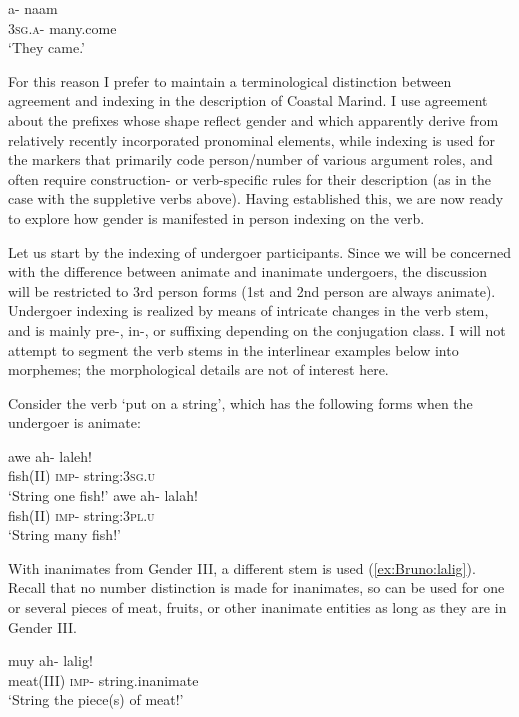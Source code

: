 \documentclass[output=collectionpaper]{langsci/langscibook}
\begin{document}
\ea
\label{ex:Bruno:naxam}
\gll a- na\GH am\\
3\textsc{sg}.\textsc{a}- many.come\\
\glt `They came.'
\z

For this reason I prefer to maintain a terminological distinction between agreement and indexing in the description of Coastal Marind. I use agreement about the prefixes whose shape reflect gender and which apparently derive from relatively recently incorporated pronominal elements, while indexing is used for the markers that primarily code person/number of various argument roles, and often require construction- or verb-specific rules for their description (as in the case with the suppletive verbs above). Having established this, we are now ready to explore how gender is manifested in person indexing on the verb.

Let us start by the indexing of undergoer participants. Since we will be concerned with the difference between animate and inanimate undergoers, the discussion will be restricted to 3rd person forms (1st and 2nd person are always animate). Undergoer indexing is realized by means of intricate changes in the verb stem, and is mainly pre-, in-, or suffixing depending on the conjugation class. I will not attempt to segment the verb stems in the interlinear examples below into morphemes; the morphological details are not of interest here.

Consider the verb `put on a string', which has the following forms when the undergoer is animate:

\ea\label{ex:Bruno:}
\begin{xlist}
\ex
\gll awe ah- laleh!\\
fish(II) \textsc{imp}- string:3\textsc{sg}.\textsc{u}\\
\glt `String one fish!'
\ex
\gll awe ah- lalah!\\
fish(II) \textsc{imp}- string:3\textsc{pl}.\textsc{u}\\
\glt `String many fish!'
\end{xlist}
\z

\noindent With inanimates from Gender III, a different stem  is used (\ref{ex:Bruno:lalig}). Recall that no number distinction is made for inanimates, so  can be used for one or several pieces of meat, fruits, or other inanimate entities as long as they are in Gender III.

\ea\label{ex:Bruno:lalig}
\gll muy ah- lalig!\\
meat(III) \textsc{imp}- string.inanimate\\
\glt `String the piece(s) of meat!'
\z
\end{document}
